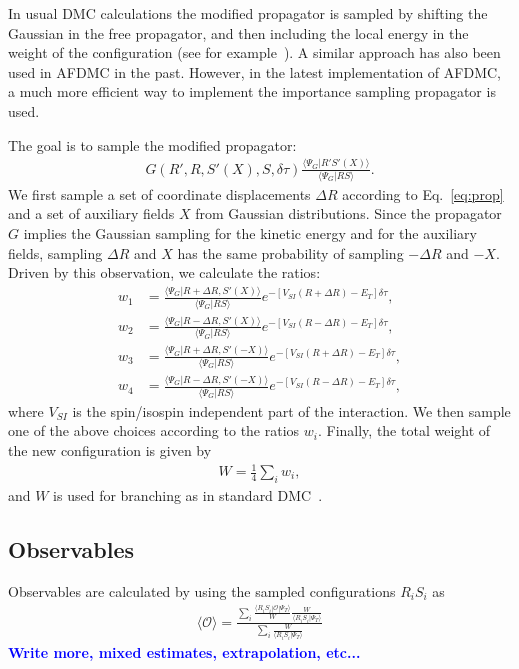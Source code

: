 \documentclass[aps,prc,twocolumn,superscriptaddress,showpacs,floatfix,nofootinbib]{revtex4-1}
\newcommand{\red}[1]{\protect\textcolor{red}{#1}}
\newcommand{\blue}[1]{\protect\textcolor{blue}{#1}}
\begin{document}
In usual DMC calculations the modified propagator is sampled by shifting the Gaussian in
the free propagator, and then including the local energy in the weight of the configuration
(see for example~\red{\cite{XXX}}). A similar approach has also been used in AFDMC in the past. 
However, in the latest implementation of AFDMC, a much more efficient way to implement the
importance sampling propagator is used.

The goal is to sample the modified propagator:
\begin{align}
G(R',R,S'(X),S,\delta\tau)\frac{\langle\Psi_G|R'S'(X)\rangle}{\langle\Psi_G|RS\rangle} .
\end{align}
We first sample a set of coordinate displacements $\Delta R$ according
to Eq.~\ref{eq:prop} and a
set of auxiliary fields $X$ from Gaussian distributions.
Since the propagator $G$ implies the Gaussian sampling for the kinetic energy and 
for the auxiliary fields, sampling $\Delta R$ and $X$ has the same probability
of sampling $-\Delta R$ and $-X$.
Driven by this observation, we calculate the ratios:
\begin{align}
w_1&=\frac{\langle\Psi_G|R+\Delta R,S'(X)\rangle}{\langle\Psi_G|RS\rangle}e^{-[V_{SI}(R+\Delta R)-E_T]\delta\tau},
\nonumber \\
w_2&=\frac{\langle\Psi_G|R-\Delta R,S'(X)\rangle}{\langle\Psi_G|RS\rangle}e^{-[V_{SI}(R-\Delta R)-E_T]\delta\tau},
\nonumber \\
w_3&=\frac{\langle\Psi_G|R+\Delta R,S'(-X)\rangle}{\langle\Psi_G|RS\rangle}e^{-[V_{SI}(R+\Delta R)-E_T]\delta\tau},
\nonumber \\
w_4&=\frac{\langle\Psi_G|R-\Delta R,S'(-X)\rangle}{\langle\Psi_G|RS\rangle}e^{-[V_{SI}(R-\Delta R)-E_T]\delta\tau},
\label{eq:w_i}
\end{align}
where $V_{SI}$ is the spin/isospin independent part of the interaction.
We then sample one of the above choices according to the ratios $w_i$.
Finally, the total weight of the new configuration is given by
\begin{align}
W=\frac{1}{4}\sum_i w_i ,
\end{align}
and $W$ is used for branching as in standard DMC~\cite{Carlson:2015}.


\subsection{Observables}
\label{sec:obs}
Observables are calculated by using the sampled configurations $R_iS_i$ as
\begin{align}
\langle \mathcal O\rangle=\frac{\sum_i \frac{\langle R_iS_i|\mathcal O|\Psi_T\rangle}{W}\frac{W}{\langle R_iS_i|\Psi_T\rangle}}
{\sum_i\frac{W}{\langle R_iS_i|\Psi_T\rangle}}
\label{eq:obs}
\end{align}
\blue{\bf Write more, mixed estimates, extrapolation, etc...}
\end{document}
